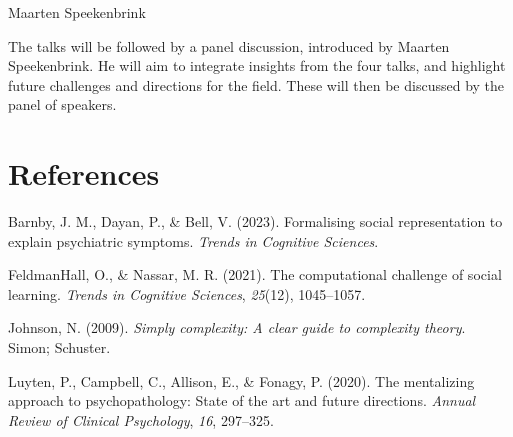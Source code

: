 \documentclass[10pt, letterpaper]{article}
\newenvironment{CSLReferences}%
  {}%
  {\par}
\begin{document}
\begin{center}
Maarten Speekenbrink
\end{center}

The talks will be followed by a panel discussion, introduced by Maarten
Speekenbrink. He will aim to integrate insights from the four talks, and
highlight future challenges and directions for the field. These will
then be discussed by the panel of speakers.

\hypertarget{references}{%
\section{References}\label{references}}

\setlength{\parindent}{-0.1in} 
\setlength{\leftskip}{0.125in}

\noindent

\hypertarget{refs}{}
\begin{CSLReferences}{1}{0}
\leavevmode{}%
Barnby, J. M., Dayan, P., \& Bell, V. (2023). Formalising social
representation to explain psychiatric symptoms. \emph{Trends in
Cognitive Sciences}.

\leavevmode{}%
FeldmanHall, O., \& Nassar, M. R. (2021). The computational challenge of
social learning. \emph{Trends in Cognitive Sciences}, \emph{25}(12),
1045--1057.

\leavevmode{}%
Johnson, N. (2009). \emph{Simply complexity: A clear guide to complexity
theory}. Simon; Schuster.

\leavevmode{}%
Luyten, P., Campbell, C., Allison, E., \& Fonagy, P. (2020). The
mentalizing approach to psychopathology: State of the art and future
directions. \emph{Annual Review of Clinical Psychology}, \emph{16},
297--325.

\end{CSLReferences}


\end{document}
